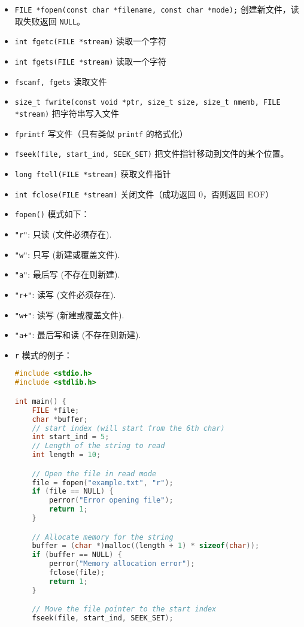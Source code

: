 
\begin{itemize}
\item \verb`FILE *fopen(const char *filename, const char *mode);` 创建新文件，读取失败返回 \verb`NULL`。
\item \verb`int fgetc(FILE *stream)` 读取一个字符
\item \verb`int fgets(FILE *stream)` 读取一个字符
\item \verb`fscanf, fgets` 读取文件
\item \verb`size_t fwrite(const void *ptr, size_t size, size_t nmemb, FILE *stream)` 把字符串写入文件
\item \verb`fprintf` 写文件（具有类似 \verb`printf` 的格式化）
\item \verb`fseek(file, start_ind, SEEK_SET)` 把文件指针移动到文件的某个位置。
\item \verb`long ftell(FILE *stream)` 获取文件指针
\item \verb`int fclose(FILE *stream)` 关闭文件（成功返回 0，否则返回 EOF）
\item \verb`fopen()` 模式如下：
\item \verb`"r"`: 只读 (文件必须存在).
\item \verb`"w"`: 只写 (新建或覆盖文件).
\item \verb`"a"`: 最后写 (不存在则新建).
\item \verb`"r+"`: 读写 (文件必须存在).
\item \verb`"w+"`: 读写 (新建或覆盖文件).
\item \verb`"a+"`: 最后写和读 (不存在则新建).
\item \verb`r` 模式的例子：
\begin{lstlisting}[language=cpp]
#include <stdio.h>
#include <stdlib.h>

int main() {
    FILE *file;
    char *buffer;
    // start index (will start from the 6th char)
    int start_ind = 5;
    // Length of the string to read
    int length = 10;

    // Open the file in read mode
    file = fopen("example.txt", "r");
    if (file == NULL) {
        perror("Error opening file");
        return 1;
    }

    // Allocate memory for the string
    buffer = (char *)malloc((length + 1) * sizeof(char));
    if (buffer == NULL) {
        perror("Memory allocation error");
        fclose(file);
        return 1;
    }

    // Move the file pointer to the start index
    fseek(file, start_ind, SEEK_SET);


\end{lstlisting}
\end{itemize}
